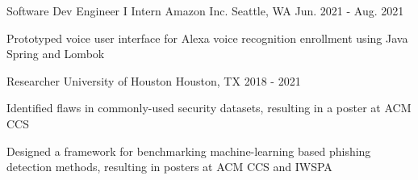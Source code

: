 \begin{cventries}
  \cventry
    {Software Dev Engineer I Intern} %
    {Amazon Inc.} %
    {Seattle, WA} %
    {Jun. 2021 - Aug. 2021} %
    {
      \begin{cvitems} %
        \item {Prototyped voice user interface for Alexa voice recognition enrollment using Java Spring and Lombok}
      \end{cvitems}
    }
  \cventry
    {Researcher} %
    {University of Houston} %
    {Houston, TX} %
    {2018 - 2021} %
    {
      \begin{cvitems} %
        \item {Identified flaws in commonly-used security datasets, resulting in a poster at ACM CCS}
        \item {Designed a framework for benchmarking machine-learning based phishing detection methods, resulting in posters at ACM CCS and IWSPA}
      \end{cvitems}
    }
\end{cventries}
